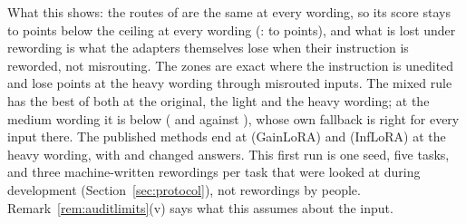 What this shows: the routes of \recog{} are the same at every wording, so its score stays
\AudURidgeBelowOwnLow{} to \AudURidgeBelowOwnHigh{} points below the ceiling at every wording
(\handicap{}: \AudUHandicapBelowOwnLow{} to \AudUHandicapBelowOwnHigh{} points), and what is lost
under rewording is what the adapters themselves lose when their instruction is reworded, not
misrouting. The zones are exact where the instruction is unedited and lose
\AudUHeavyCertBelowOwn{} points at the heavy wording through misrouted
inputs. The mixed rule has the best of both at the original, the light and the heavy wording; at
the medium wording it is below \cert{} (\AudUMediumMixRidgeAP{} and \AudUMediumMixHandicapAP{}
against \AudUMediumCertAP{}), whose own fallback is right for every input there. The published
methods end at \AudWordHeavyGainloraAP{} (GainLoRA) and \AudWordHeavyInfloraAP{} (InfLoRA) at the
heavy wording, with \AudWordHeavyGainloraChanged{} and \AudWordHeavyInfloraChanged{} changed
answers. This first run is one seed, five tasks, and three machine-written rewordings per task
that were looked at during development (Section~\ref{sec:protocol}), not
rewordings by people. Remark~\ref{rem:auditlimits}(v) says what this assumes about
the input.

